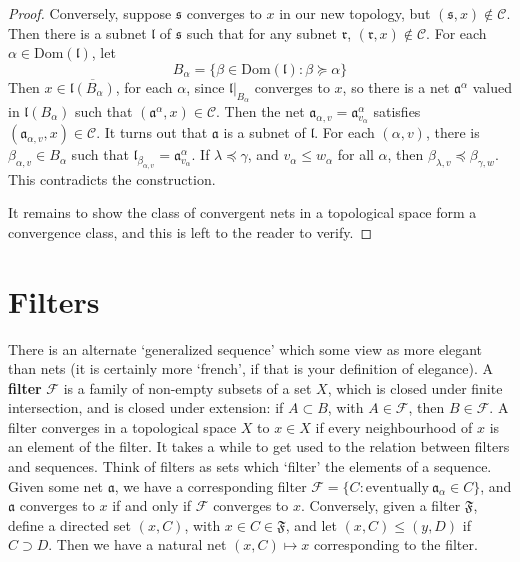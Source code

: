 \begin{example}
\begin{proof}
    Conversely, suppose $\mathfrak{s}$ converges to $x$ in our new topology, but $(\mathfrak{s},x) \not \in \mathcal{C}$. Then there is a subnet $\mathfrak{l}$ of $\mathfrak{s}$ such that for any subnet $\mathfrak{r}$, $(\mathfrak{r}, x) \not \in \mathcal{C}$. For each $\alpha \in \text{Dom}(\mathfrak{l})$, let
    \[ B_\alpha = \{ \beta \in \text{Dom}(\mathfrak{l}) : \beta \succeq \alpha \} \]
    Then $x \in \overline{\mathfrak{l}(B_\alpha)}$, for each $\alpha$, since $\mathfrak{l}|_{B_\alpha}$ converges to $x$, so there is a net $\mathfrak{a}^\alpha$ valued in $\mathfrak{l}(B_\alpha)$ such that $(\mathfrak{a}^\alpha, x) \in \mathcal{C}$. Then the net $\mathfrak{a}_{\alpha, v} = \mathfrak{a}^\alpha_{v_\alpha}$ satisfies $(\mathfrak{a}_{\alpha, v}, x) \in \mathcal{C}$. It turns out that $\mathfrak{a}$ is a subnet of $\mathfrak{l}$. For each $(\alpha, v)$, there is $\beta_{\alpha,v} \in B_\alpha$ such that $\mathfrak{l}_{\beta_{\alpha,v}} = \mathfrak{a}^\alpha_{v_\alpha}$. If $\lambda \preceq \gamma$, and $v_\alpha \leq w_\alpha$ for all $\alpha$, then $\beta_{\lambda,v} \preceq \beta_{\gamma,w}$. This contradicts the construction.

    It remains to show the class of convergent nets in a topological space form a convergence class, and this is left to the reader to verify.
\end{proof}

\section{Filters}

There is an alternate `generalized sequence' which some view as more elegant than nets (it is certainly more `french', if that is your definition of elegance). A {\bf filter} $\mathcal{F}$ is a family of non-empty subsets of a set $X$, which is closed under finite intersection, and is closed under extension: if $A \subset B$, with $A \in \mathcal{F}$, then $B \in \mathcal{F}$. A filter converges in a topological space $X$ to $x \in X$ if every neighbourhood of $x$ is an element of the filter. It takes a while to get used to the relation between filters and sequences. Think of filters as sets which `filter' the elements of a sequence. Given some net $\mathfrak{a}$, we have a corresponding filter $\mathcal{F} = \{ C : \text{eventually}\ \mathfrak{a}_\alpha \in C \}$, and $\mathfrak{a}$ converges to $x$ if and only if $\mathcal{F}$ converges to $x$. Conversely, given a filter $\mathfrak{F}$, define a directed set $(x,C)$, with $x \in C \in \mathfrak{F}$, and let $(x,C) \leq (y,D)$ if $C \supset D$. Then we have a natural net $(x,C) \mapsto x$ corresponding to the filter.


\end{example}
